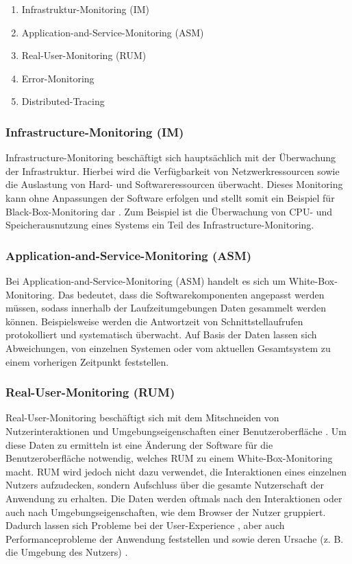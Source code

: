 \begin{enumerate}
	\item Infrastruktur-Monitoring (IM)
	\item Application-and-Service-Monitoring (ASM)
	\item Real-User-Monitoring (RUM)
	\item Error-Monitoring
	\item Distributed-Tracing
\end{enumerate}

\subsubsection{Infrastructure-Monitoring (IM)}

Infrastructure-Monitoring beschäftigt sich hauptsächlich mit der Überwachung der Infrastruktur. Hierbei wird die Verfügbarkeit von Netzwerkressourcen sowie die Auslastung von Hard- und Softwareressourcen überwacht. Dieses Monitoring kann ohne Anpassungen der Software erfolgen und stellt somit ein Beispiel für Black-Box-Monitoring dar \cite{ClientSideMonitoringOfDistributedSystems}. Zum Beispiel ist die Überwachung von CPU- und Speicherausnutzung eines Systems ein Teil des Infrastructure-Monitoring.

\subsubsection{Application-and-Service-Monitoring (ASM)}

Bei Application-and-Service-Monitoring (ASM) handelt es sich um White-Box-Monitoring. Das bedeutet, dass die Softwarekomponenten angepasst werden müssen, sodass innerhalb der Laufzeitumgebungen Daten gesammelt werden können. Beispielsweise werden die Antwortzeit von Schnittstellaufrufen protokolliert und systematisch überwacht. Auf Basis der Daten lassen sich Abweichungen, von einzelnen Systemen oder vom aktuellen Gesamtsystem zu einem vorherigen Zeitpunkt feststellen.

\subsubsection{Real-User-Monitoring (RUM)}


Real-User-Monitoring beschäftigt sich mit dem Mitschneiden von Nutzerinteraktionen und Umgebungseigenschaften einer Benutzeroberfläche \cite{IdentifyingWebPerformanceDegradations}. Um diese Daten zu ermitteln ist eine Änderung der Software für die Benutzeroberfläche notwendig, welches RUM zu einem White-Box-Monitoring macht. RUM wird jedoch nicht dazu verwendet, die Interaktionen eines einzelnen Nutzers aufzudecken, sondern Aufschluss über die gesamte Nutzerschaft der Anwendung zu erhalten. Die Daten werden oftmals nach den Interaktionen oder auch nach Umgebungseigenschaften, wie dem Browser der Nutzer gruppiert. Dadurch lassen sich Probleme bei der User-Experience \cite{AConceptLatticeForRecognitionOfUserProblems}, aber auch Performanceprobleme der Anwendung feststellen und sowie deren Ursache (z. B. die Umgebung des Nutzers) \cite{IdentifyingWebPerformanceDegradations}.

